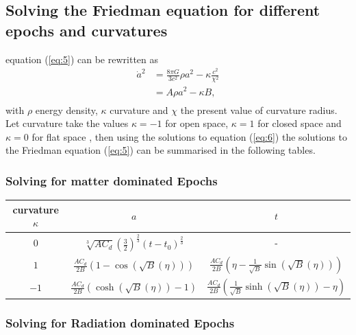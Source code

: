 \documentclass[a4paper, 11pt]{FSKH_623_Report}
\numberwithin{equation}{section}
\newcommand{\brac}[1]{\left(#1\right)}
\begin{document}
\subsection{Solving the Friedman equation for different epochs and curvatures}
equation (\ref{eq:5}) can be rewritten as \citep{notes4}
\begin{equation}
\begin{split}\label{eq:CurvFriedman}
\dot{a}^{2} &= \frac{8\pi G}{3c^{2}}\rho a^{2}-\kappa\frac{c^{2}}{\chi^{2}}\\
&= A\rho a^{2}-\kappa B,\\
\end{split}
\end{equation}
with $\rho$ energy density, $\kappa$ curvature and $\chi$ the present value of curvature radius. Let curvature take the values $\kappa=-1$ for open space, $\kappa=1$ for closed space and $\kappa=0$ for flat space \citep{Curv}, then using the solutions to equation (\ref{eq:6}) the solutions to the Friedman equation (\ref{eq:5}) can be summarised in the following tables.
\subsubsection{Solving for matter dominated Epochs}
\begin{table}[H]
\centering
\begin{tabular}{| c | c | c |}
\hline\hline
curvature $\kappa$ &$a$  &$t$ \\
\hline\hline
$0$  &$\sqrt[3]{AC_{d}}\brac{\frac{3}{2}}^\frac{2}{3}\brac{t-t_{0}}^{\frac{2}{3}}$ & - \\
\hline
$1$  &$\frac{AC_{d}}{2B}\brac{1-\cos\brac{\sqrt{B}\brac{\eta}}}$ & $\frac{AC_{d}}{2B}\brac{\eta-\frac{1}{\sqrt{B}}\sin\brac{\sqrt{B}\brac{\eta}}}$ \\
\hline
$-1$  & $\frac{AC_{d}}{2B}\brac{\cosh\brac{\sqrt{B}\brac{\eta}}-1}$ & $\frac{AC_{d}}{2B}\brac{\frac{1}{\sqrt{B}}\sinh\brac{\sqrt{B}\brac{\eta}}-\eta}$ \\
\hline
\end{tabular}
\end{table}
\subsubsection{Solving for Radiation dominated Epochs}
\end{document}
